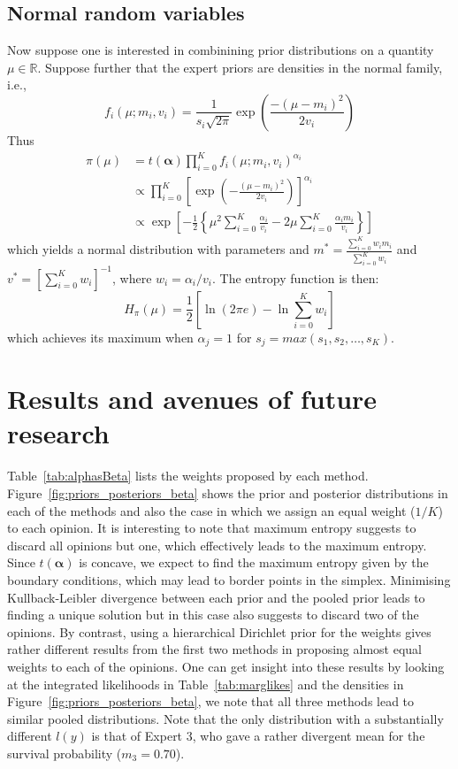 \documentclass[a4paper, notitlepage, 11pt]{article}
\begin{document}
\subsection*{Normal random variables} %
\label{sec:normal}
Now suppose one is interested in combinining prior distributions on a quantity $\mu \in \mathbb{R}$.
Suppose further that the expert priors are densities in the normal family, i.e.,
$$ f_i(\mu; m_i,v_i) = \frac{1}{s_i\sqrt{2\pi}} \exp\left(\frac{-(\mu-m_i)^2}{2v_i}\right) $$
Thus 
\begin{align}
\pi(\mu)&= t(\boldsymbol\alpha)\prod_{i=0}^{K}f_i(\mu; m_i, v_i)^{\alpha_i}\\
 &\propto \prod_{i=0}^{K} \left[ \exp \left(-\frac{(\mu-m_i)^2}{2v_i} \right) \right]^{\alpha_i} \\
&\propto \exp\left[-\frac{1}{2}\left\{\mu^2 \sum_{i=0}^K\frac{\alpha_i}{v_i} - 2 \mu \sum_{i=0}^K \frac{\alpha_i m_i}{v_i} \right\} \right] %
\end{align}
which yields a normal distribution with parameters and $m^* = \frac{\sum_{i=0}^K w_i m_i}{\sum_{i=0}^K w_i}$ and $v^* = [\sum_{i=0}^K w_i]^{-1}$,  where $w_i = \alpha_i/v_i$.
The entropy function is then:
\begin{equation}
 \label{eq:normalpoolentropy}
 H_{\pi}(\mu) = \frac{1}{2}\left[ \ln(2\pi e) - \ln\sum_{i=0}^K w_i\right]
\end{equation}
which achieves its maximum when $\alpha_j = 1$ for $s_j = max(s_1, s_2, \ldots, s_K)$.


\section*{Results and avenues of future research}

Table~\ref{tab:alphasBeta} lists the weights proposed by each method.
Figure~\ref{fig:priors_posteriors_beta} shows the prior and posterior distributions in each of the methods and also the case in which we assign an equal weight ($1/K$) to each opinion.
It is interesting to note that maximum entropy suggests to discard all opinions but one, which effectively leads to the maximum entropy.
Since $t(\boldsymbol\alpha)$ is concave, we expect to find the maximum entropy given by the boundary conditions, which may lead to border points in the simplex.
Minimising Kullback-Leibler divergence between each prior and the pooled prior leads to finding a unique solution but in this case also suggests to discard two of the opinions.
By contrast, using a hierarchical Dirichlet prior for the weights gives rather different results from the first two methods in proposing almost equal weights to each of the opinions.
One can get insight into these results by looking at the integrated likelihoods in Table~\ref{tab:marglikes} and the densities in Figure~\ref{fig:priors_posteriors_beta}, we note that all three methods lead  to similar pooled distributions.
Note that the only distribution with a substantially different $l(y)$ is that of Expert 3, who gave a rather divergent mean for the survival probability ($m_3=0.70$).
\end{document}
